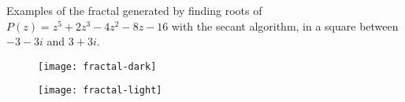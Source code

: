 \documentclass[a4paper]{article}
\begin{document}
\setlength{\parindent}{0em}
\setlength{\parskip}{1em}

Examples of the fractal generated by finding roots of $P(z) = z^5 + 2z^3 - 4z^2 - 8z - 16$ with the secant algorithm, in a square between $-3-3i$ and $3+3i$.

\begin{figure}[h]
    \centering
    \texttt{[image: fractal-dark]}
\end{figure}

\begin{figure}[h]
    \centering
    \texttt{[image: fractal-light]}
\end{figure}
\end{document}
